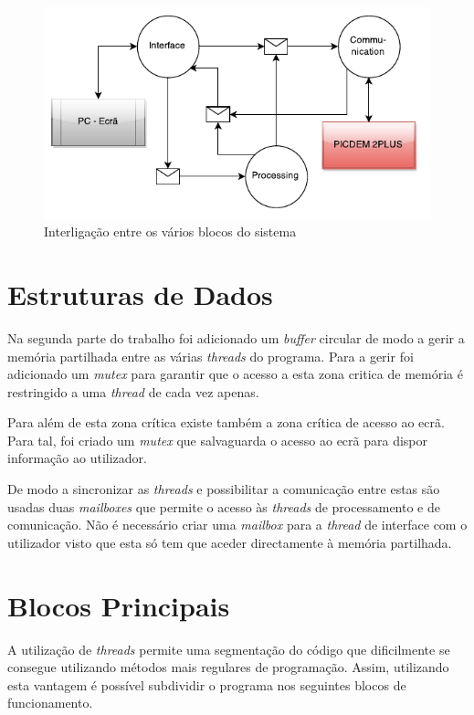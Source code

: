 \documentclass[a4paper]{article}
\begin{document}
	\begin{figure}[h]
    	\centering
    	\includegraphics[scale=1]{img/threads}
        \caption{Interligação entre os vários blocos do sistema}
        \label{fig:threads_communication}
	\end{figure}




	\section{Estruturas de Dados}
    Na segunda parte do trabalho foi adicionado um \textit{buffer} circular de modo a gerir a memória partilhada entre as várias \textit{threads} do programa. Para a gerir foi adicionado um \textit{mutex} para garantir que o acesso a esta zona critica de memória é restringido a uma \textit{thread} de cada vez apenas.
    
	Para além de esta zona crítica existe também a zona crítica de acesso ao ecrã. Para tal, foi criado um \textit{mutex} que salvaguarda o acesso ao ecrã para dispor informação ao utilizador.
    
    De modo a sincronizar as \textit{threads} e possibilitar a comunicação entre estas são usadas duas \textit{mailboxes} que permite o acesso às \textit{threads} de processamento e de comunicação. Não é necessário criar uma \textit{mailbox} para a \textit{thread} de interface com o utilizador visto que esta só tem que aceder directamente à memória partilhada.




	\section{Blocos Principais}
    
    A utilização de \textit{threads} permite uma segmentação do código que dificilmente se consegue utilizando métodos mais regulares de programação. Assim, utilizando esta vantagem é possível subdividir o programa nos seguintes blocos de funcionamento.
\end{document}
